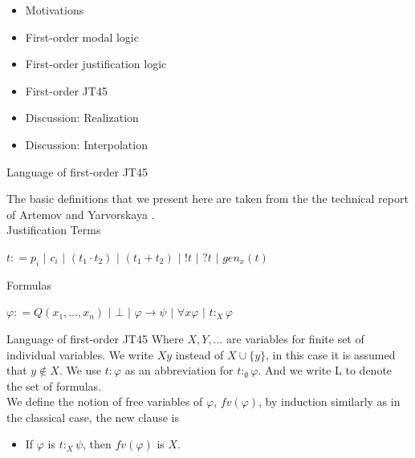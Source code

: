 \documentclass{beamer}
\theoremstyle{definition}
\newcommand{\impli}{\rightarrow}
\newcommand{\todo}{\forall}
\newcommand{\vazio}{\emptyset}
\begin{document}
\begin{frame}
	\begin{itemize}
		\item[] Motivations
		\vspace{5mm}	
		\item[] First-order modal logic
		\vspace{5mm}
		\item[] First-order justification logic
		\vspace{5mm}
		\item[] {\color{blue}First-order JT45}
		\vspace{5mm}
		\item[] Discussion: Realization
		\vspace{5mm}
		\item[] Discussion: Interpolation
	\end{itemize} 
\end{frame}



\begin{frame}{Language of first-order JT45}

\qquad The basic definitions that we present here are taken from the the technical report of Artemov and Yarvorskaya \cite{Artemov11}.\\
\vspace{5mm}
Justification Terms
	\begin{center}
		$ t : = p_{i}$   $|$ $c_{i}$ $|$  $(t_{1} \cdot t_{2})$ $|$ $(t_{1} + t_{2})$ $|$  $!t$ $|$ $?t$ $|$ $gen_{x}(t)$
	\end{center}
\vspace{5mm}	
Formulas
	\begin{center}
		$ \varphi : = Q(x_1, \dots, x_n)$   $|$ $\bot$ $|$  $\varphi \impli \psi$ $|$ $\todo x \varphi$ $|$  $t$$:_{X}$$\varphi$
	\end{center}


\end{frame}
	

\begin{frame}{Language of first-order JT45}
\qquad Where $X, Y, \dots$ are variables for finite set of individual variables.  We write $Xy$ instead of $X \cup \{y\}$, in this case it is assumed that $y \notin X$. We use $t$$:$$\varphi$ as an abbreviation for $t$$:_{\vazio}$$\varphi$. And we write L to denote the set of formulas.\\
\vspace{5mm}
\qquad We define the notion of free variables of $\varphi$, $fv(\varphi)$, by induction similarly as in the classical case, the new clause is
\begin{itemize} 
\item If $\varphi$ is $t$$:_{X}$$\psi$, then  $fv(\varphi)$ is $X$.
\end{itemize}
 
\end{frame}	
		
\end{document}
